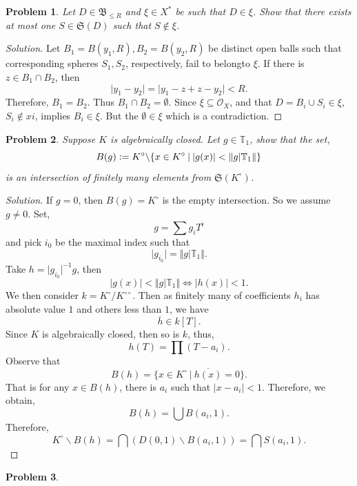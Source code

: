 \documentclass[8pt]{article}
\numberwithin{equation}{section}
\newenvironment{solution}{\begin{proof}[Solution]}{\end{proof}}
\newtheorem{problem}{Problem}[section]
\newcommand{\defeq}{\vcentcolon=}
\newcommand{\Ouv}{\mathscr{O}}
\newcommand{\norm}[1]{\Vert #1 \Vert}
\newcommand{\T}[0]{\mathbb{T}}
\newcommand{\sep}[0]{\:|\:}
\newcommand{\ab}[1]{\vert #1 \vert}
\newcommand{\dcirc}[0]{{\circ\circ}}
\begin{document}
\begin{problem}
  Let $D\in\mathfrak{B}_{\leq R}$ and $\xi\in X^*$ be such that $D\in\xi$. Show that there exists at most one $S\in\mathfrak{S}(D)$ such that $S\not\in \xi$.
\end{problem}
\begin{solution}
  Let $B_1=B(y_1,R),B_2=B(y_2,R)$ be distinct open balls such that corresponding spheres $S_1,S_2$, respectively, fail to belongto $\xi$. If there is $z\in B_1\cap B_2$, then
  \begin{equation*}
    \ab{y_1-y_2} = \ab{y_1-z+z-y_2} <R.
  \end{equation*}
  Therefore, $B_1=B_2$. Thus $B_1\cap B_2=\emptyset$. Since $\xi\subseteq\Ouv_X$, and that $D=B_i\cup S_i\in \xi$, $S_i\not\in xi$, implies $B_i\in\xi$. But the $\emptyset\in\xi$ which is a contradiction.
\end{solution}
\begin{problem}
  Suppose $K$ is algebraically closed.
  Let $g\in\T_1$, show that the set,
  \begin{equation*}
    B(g) \defeq K^\circ\backslash\{x\in K^\circ\sep \ab{g(x)}<\norm{g|\T_1}\}
  \end{equation*}
  is an intersection of finitely many elements from $\mathfrak{S}(K^\circ)$. 
\end{problem}
\begin{solution}
  If $g=0$, then $B(g)=K^\circ$ is the empty intersection. So we assume $g\not=0$. Set,
  \begin{equation*}
    g = \sum g_iT^i
  \end{equation*}
  and pick $i_0$ be the maximal index such that 
  \begin{equation*}
    \ab{g_{i_0}}=\norm{g|\T_1}.
  \end{equation*}
  Take $h = \ab{g_{i_0}}^{-1}g$, then 
  \begin{equation*}
    \ab{g(x)}<\norm{g|\T_1}\iff \ab{h(x)}<1.
  \end{equation*}
  We then consider $k = K^\circ/K^\dcirc$. Then as finitely many of coefficients $h_i$ has absolute value $1$ and others less than $1$, we have
  \begin{equation*}
    \overline{h} \in k[T].
  \end{equation*}
  Since $K$ is algebraically closed, then so is $k$, thus,
  \begin{equation*}
    h(T) = \prod (T-a_i).
  \end{equation*}
  Observe that 
  \begin{equation*}
    B(h) = \{x\in K^\circ\sep \overline{h(x)} = 0\}.
  \end{equation*}
  That is for any $x\in B(h)$, there is $a_i$ such that $\ab{x-a_i}<1$. Therefore, we obtain,
  \begin{equation*}
    B(h) = \bigcup B(a_i,1).
  \end{equation*} 
  Therefore,
  \begin{equation*}
    K^\circ\backslash B(h) = \bigcap (D(0,1)\backslash B(a_i,1)) = \bigcap S(a_i,1).
  \end{equation*}
\end{solution}
\begin{problem}
  
\end{problem}
\section{}
\end{document}
